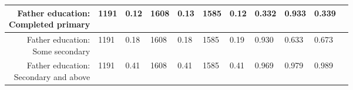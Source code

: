\begin{longtable}{|r|l|l|l|l|l|l|l|l|l|l}
	 \makecell{Father education: \\ Completed primary}                                & 1191                                                               &  0.12                                                              & 1608                                                               &  0.13                                                              & 1585                                                               &  0.12                                                              & 0.332                                                              & 0.933                                                              & 0.339                                                             \\

\hline

	 \makecell{Father education: \\ Some secondary}                                   & 1191                                                               &  0.18                                                              & 1608                                                               &  0.18                                                              & 1585                                                               &  0.19                                                              & 0.930                                                              & 0.633                                                              & 0.673                                                             \\

\hline

	 \makecell{Father education: \\ Secondary and above}                              & 1191                                                               &  0.41                                                              & 1608                                                               &  0.41                                                              & 1585                                                               &  0.41                                                              & 0.969                                                              & 0.979                                                              & 0.989                                                             \\

\hline


\end{longtable}
